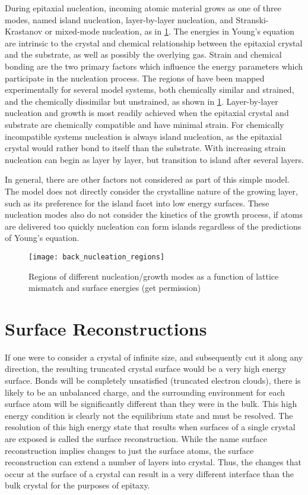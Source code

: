 During epitaxial nucleation, incoming atomic material grows as one of three modes, named island nucleation, layer-by-layer nucleation, and Stranski-Krastanov or mixed-mode nucleation, as in \cref{fig:back_nucleation_regions}. The energies in Young's equation are intrinsic to the crystal and chemical relationship between the epitaxial crystal and the substrate, as well as possibly the overlying gas. Strain and chemical bonding are the two primary factors which influence the energy parameters which participate in the nucleation process. The regions of have been mapped experimentally for several model systems, both chemically similar and strained, and the chemically dissimilar but unstrained, as shown in \cref{fig:back_nucleation_regions}. Layer-by-layer nucleation and growth is most readily achieved when the epitaxial crystal and substrate are chemically compatible and have minimal strain. For chemically incompatible systems nucleation is always island nucleation, as the epitaxial crystal would rather bond to itself than the substrate. With increasing strain nucleation can begin as layer by layer, but transition to island after several layers.

In general, there are other factors not considered as part of this simple model. The model does not directly consider the crystalline nature of the growing layer, such as its preference for the island facet into low energy surfaces. These nucleation modes also do not consider the kinetics of the growth process, if atoms are delivered too quickly nucleation can form islands regardless of the predictions of Young's equation.
\begin{figure}
    \centering
    \texttt{[image: back\_nucleation\_regions]}
    \caption[Nucleation phase diagram of surface energy and strain]{\label{fig:back_nucleation_regions}Regions of different nucleation/growth modes as a function of lattice mismatch and surface energies\cite{ohring2001materials} (get permission)}
\end{figure}

\section{Surface Reconstructions}\label{sec:reconstruction}
If one were to consider a crystal of infinite size, and subsequently cut it along any direction, the resulting truncated crystal surface would be a very high energy surface. Bonds will be completely unsatisfied (truncated electron clouds), there is likely to be an unbalanced charge, and the surrounding environment for each surface atom will be significantly different than they were in the bulk. This high energy condition is clearly not the equilibrium state and must be resolved. The resolution of this high energy state that results when surfaces of a single crystal are exposed is called the surface reconstruction. While the name surface reconstruction implies changes to just the surface atoms, the surface reconstruction can extend a number of layers into crystal. Thus, the changes that occur at the surface of a crystal can result in a very different interface than the bulk crystal for the purposes of epitaxy.

